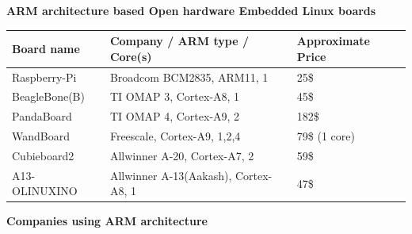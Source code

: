\documentclass[letterpaper,10pt,english]{sphinxmanual}
\begin{document}
\begin{DUlineblock}{0em}
\item[] 
\end{DUlineblock}

\textbf{ARM architecture based Open hardware Embedded Linux boards}

\begin{tabulary}{\linewidth}{|L|L|L|}
\hline
\textbf{
Board name
} & \textbf{
Company / ARM type / Core(s)
} & \textbf{
Approximate Price
}\\\hline

Raspberry-Pi
 & 
Broadcom BCM2835, ARM11, 1
 & 
25\$
\\\hline

BeagleBone(B)
 & 
TI OMAP 3, Cortex-A8, 1
 & 
45\$
\\\hline

PandaBoard
 & 
TI OMAP 4, Cortex-A9, 2
 & 
182\$
\\\hline

WandBoard
 & 
Freescale, Cortex-A9, 1,2,4
 & 
79\$ (1 core)
\\\hline

Cubieboard2
 & 
Allwinner A-20, Cortex-A7, 2
 & 
59\$
\\\hline

A13-OLINUXINO
 & 
Allwinner A-13(Aakash), Cortex-A8, 1
 & 
47\$
\\\hline
\end{tabulary}


\begin{DUlineblock}{0em}
\item[] 
\end{DUlineblock}

\textbf{Companies using ARM architecture}
\end{document}
